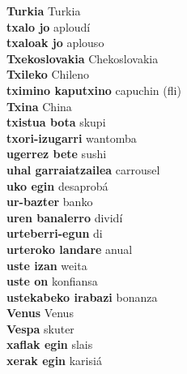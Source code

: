 \textbf{ Turkia  } Turkia \\
\textbf{ txalo jo  } aploudí \\
\textbf{ txaloak jo  } aplouso \\
\textbf{ Txekoslovakia  } Chekoslovakia \\
\textbf{ Txileko  } Chileno \\
\textbf{ tximino kaputxino  } capuchin (fli) \\
\textbf{ Txina  } China \\
\textbf{ txistua bota  } skupi \\
\textbf{ txori-izugarri  } wantomba \\
\textbf{ ugerrez bete  } sushi \\
\textbf{ uhal garraiatzailea  } carrousel \\
\textbf{ uko egin  } desaprobá \\
\textbf{ ur-bazter  } banko \\
\textbf{ uren banalerro  } dividí \\
\textbf{ urteberri-egun  } di \\
\textbf{ urteroko landare  } anual \\
\textbf{ uste izan  } weita \\
\textbf{ uste on  } konfiansa \\
\textbf{ ustekabeko irabazi  } bonanza \\
\textbf{ Venus  } Venus \\
\textbf{ Vespa  } skuter \\
\textbf{ xaflak egin  } slais \\
\textbf{ xerak egin  } karisiá \\
